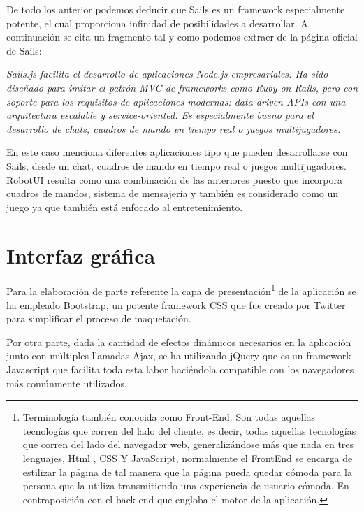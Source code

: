\documentclass[a4paper,12pt]{article}
\begin{document}
De todo los anterior podemos deducir que Sails es un framework especialmente potente, el cual proporciona infinidad de posibilidades a desarrollar. A continuación se cita un fragmento tal y 
como podemos extraer de la página oficial de Sails:\\

\begin{center}
\emph{Sails.js facilita el desarrollo de aplicaciones Node.js empresariales. Ha sido diseñado para imitar el patrón MVC de frameworks como Ruby on Rails, pero con soporte para los requisitos de aplicaciones modernas: data-driven APIs con una arquitectura escalable y service-oriented. Es especialmente bueno para el desarrollo de chats, cuadros de mando en tiempo real o juegos
multijugadores.} 
\end{center}


En este caso menciona diferentes aplicaciones tipo que pueden desarrollarse con Sails, desde un chat, cuadros de mando en tiempo real o juegos multijugadores. RobotUI resulta como una combinación de las 
anteriores puesto que incorpora cuadros de mandos, sistema de mensajería y también es considerado como un juego ya que también está enfocado al entretenimiento.\\


\section{ Interfaz gráfica }

Para la elaboración de parte referente la capa de presentación\footnote{ Terminología también conocida como Front-End. Son todas aquellas tecnologías que corren del lado del cliente, es decir, todas aquellas 
tecnologías que corren del lado del navegador web, generalizándose más que nada en tres lenguajes, Html , CSS Y JavaScript, normalmente el FrontEnd se encarga de estilizar la página de tal manera que la 
página pueda quedar cómoda para la persona que la utiliza transmitiendo una experiencia de usuario cómoda. En contraposición con el back-end que engloba el motor de la aplicación.} de la aplicación se ha 
empleado Bootstrap, un potente framework CSS que fue creado por Twitter para simplificar el proceso de maquetación. 

Por otra parte, dada la cantidad de efectos dinámicos necesarios en la aplicación junto con múltiples llamadas Ajax, se ha utilizando jQuery que es un framework Javascript que facilita toda esta
labor haciéndola compatible con los navegadores más comúnmente utilizados.\\
\end{document}
